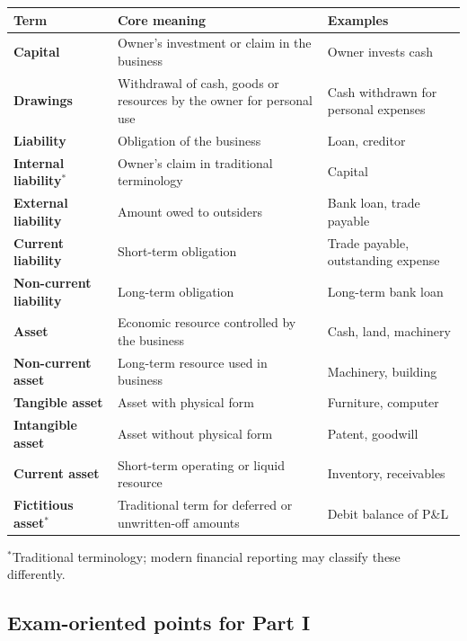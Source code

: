 \documentclass[11pt,a4paper]{article}
\begin{document}
\begin{center}
\small
\begin{tabularx}{\textwidth}{@{}l Y Y@{}}
\toprule
{}\textbf{Term} & \textbf{Core meaning} & \textbf{Examples}\\
\midrule
\textbf{Capital} & Owner's investment or claim in the business & Owner invests cash\\
\textbf{Drawings} & Withdrawal of cash, goods or resources by the owner for personal use & Cash withdrawn for personal expenses\\
\textbf{Liability} & Obligation of the business & Loan, creditor\\
\textbf{Internal liability}$^{*}$ & Owner's claim in traditional terminology & Capital\\
\textbf{External liability} & Amount owed to outsiders & Bank loan, trade payable\\
\textbf{Current liability} & Short-term obligation & Trade payable, outstanding expense\\
\textbf{Non-current liability} & Long-term obligation & Long-term bank loan\\
\textbf{Asset} & Economic resource controlled by the business & Cash, land, machinery\\
\textbf{Non-current asset} & Long-term resource used in business & Machinery, building\\
\textbf{Tangible asset} & Asset with physical form & Furniture, computer\\
\textbf{Intangible asset} & Asset without physical form & Patent, goodwill\\
\textbf{Current asset} & Short-term operating or liquid resource & Inventory, receivables\\
\textbf{Fictitious asset}$^{*}$ & Traditional term for deferred or unwritten-off amounts & Debit balance of P\&L\\
\bottomrule
\end{tabularx}

{\footnotesize $^{*}$Traditional terminology; modern financial reporting may classify these differently.}
\end{center}

\subsection{Exam-oriented points for Part I}
\end{document}
